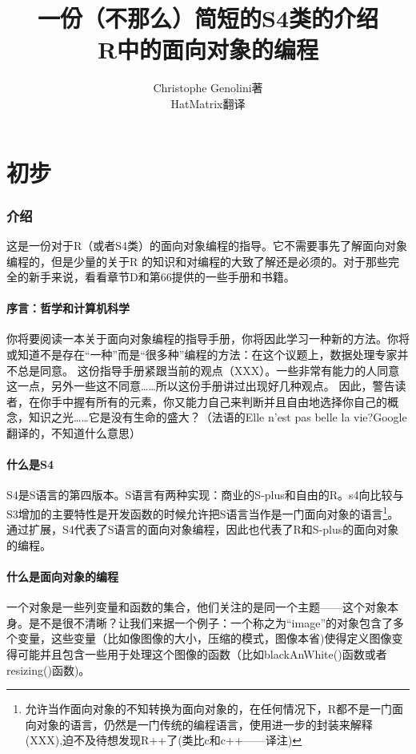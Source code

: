 \documentclass[12pt,a4paper]{article}\usepackage{graphicx, color}
\title{一份（不那么）简短的S4类的介绍\\[2ex]R中的面向对象的编程}
\author{Christophe Genolini著{ }\\ HatMatrix翻译}
\begin{document}
\maketitle
\tableofcontents

\part{初步}
\section{介绍}
这是一份对于R（或者S4类）的面向对象编程的指导。它不需要事先了解面向对象编程的，但是少量的关于R
的知识和对编程的大致了解还是必须的。对于那些完全的新手来说，看看章节D和第66提供的一些手册和书籍。
\subsection{序言：哲学和计算机科学}
你将要阅读一本关于面向对象编程的指导手册，你将因此学习一种新的方法。你将或知道不是存在“一种”而是“很多种”编程的方法：在这个议题上，数据处理专家并不总是同意。
这份指导手册紧跟当前的观点（XXX）。一些非常有能力的人同意这一点，另外一些这不同意……所以这份手册讲过出现好几种观点。
因此，警告读者，在你手中握有所有的元素，你又能力自己来判断并且自由地选择你自己的概念，知识之光……它是没有生命的盛大？（法语的Elle n’est pas
belle la vie?Google翻译的，不知道什么意思）

\subsection{什么是S4}
S4是S语言的第四版本。S语言有两种实现：商业的S-plus和自由的R。s4向比较与S3增加的主要特性是开发函数的时候允许把S语言当作是一门面向对象的语言\footnote{允许当作面向对象的不知转换为面向对象的，在任何情况下，R都不是一门面向对象的语言，仍然是一门传统的编程语言，使用进一步的封装来解释(XXX),迫不及待想发现R++了(类比c和c++——译注)}。通过扩展，S4代表了S语言的面向对象编程，因此也代表了R和S-plus的面向对象的编程。

\subsection{什么是面向对象的编程}
一个对象是一些列变量和函数的集合，他们关注的是同一个主题——这个对象本身。是不是很不清晰？让我们来据一个例子：一个称之为“image”的对象包含了多个变量，这些变量（比如像图像的大小，压缩的模式，图像本省)使得定义图像变得可能并且包含一些用于处理这个图像的函数（比如blackAnWhite()函数或者resizing()函数)。
\end{document}
